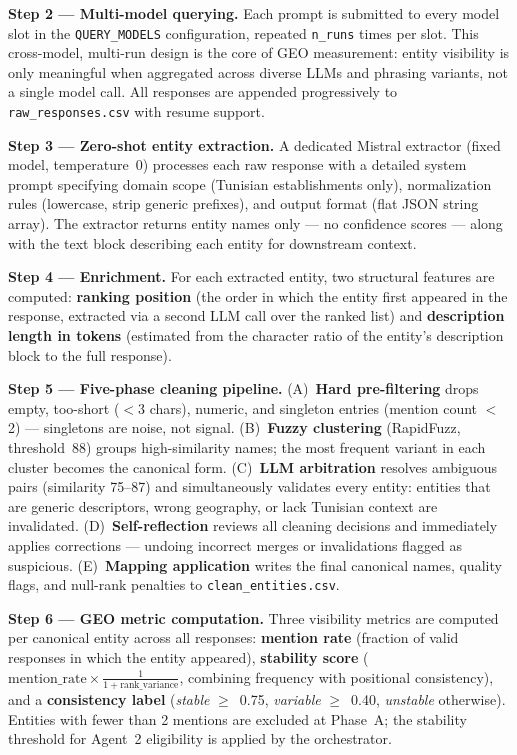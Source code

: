\textbf{Step 2 --- Multi-model querying.} Each prompt is submitted to every
model slot in the \texttt{QUERY\_MODELS} configuration, repeated \texttt{n\_runs}
times per slot. This cross-model, multi-run design is the core of GEO measurement:
entity visibility is only meaningful when aggregated across diverse LLMs and
phrasing variants, not a single model call. All responses are appended
progressively to \texttt{raw\_responses.csv} with resume support.

\textbf{Step 3 --- Zero-shot entity extraction.} A dedicated Mistral extractor
(fixed model, temperature~0) processes each raw response with a detailed system
prompt specifying domain scope (Tunisian establishments only), normalization rules
(lowercase, strip generic prefixes), and output format (flat JSON string array).
The extractor returns entity names only --- no confidence scores --- along with the
text block describing each entity for downstream context.

\textbf{Step 4 --- Enrichment.} For each extracted entity, two structural features
are computed: \textbf{ranking position} (the order in which the entity first
appeared in the response, extracted via a second LLM call over the ranked list) and
\textbf{description length in tokens} (estimated from the character ratio of the
entity's description block to the full response).

\textbf{Step 5 --- Five-phase cleaning pipeline.}
(A)~\textbf{Hard pre-filtering} drops empty, too-short ($<$3 chars), numeric, and
singleton entries (mention count $<$ 2) --- singletons are noise, not signal.
(B)~\textbf{Fuzzy clustering} (RapidFuzz, threshold~88) groups high-similarity
names; the most frequent variant in each cluster becomes the canonical form.
(C)~\textbf{LLM arbitration} resolves ambiguous pairs (similarity 75--87) and
simultaneously validates every entity: entities that are generic descriptors, wrong
geography, or lack Tunisian context are invalidated.
(D)~\textbf{Self-reflection} reviews all cleaning decisions and immediately applies
corrections --- undoing incorrect merges or invalidations flagged as suspicious.
(E)~\textbf{Mapping application} writes the final canonical names, quality flags,
and null-rank penalties to \texttt{clean\_entities.csv}.

\textbf{Step 6 --- GEO metric computation.} Three visibility metrics are computed
per canonical entity across all responses: \textbf{mention rate} (fraction of
valid responses in which the entity appeared), \textbf{stability score}
($\text{mention\_rate} \times \frac{1}{1+\text{rank\_variance}}$, combining
frequency with positional consistency), and a \textbf{consistency label}
(\textit{stable} $\geq$~0.75, \textit{variable} $\geq$~0.40, \textit{unstable}
otherwise). Entities with fewer than 2 mentions are excluded at Phase~A; the
stability threshold for Agent~2 eligibility is applied by the orchestrator.


